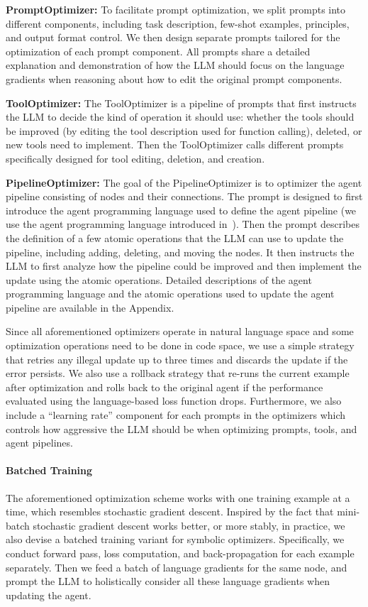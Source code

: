 \documentclass{article}
\begin{document}
\noindent\textbf{PromptOptimizer:} To facilitate prompt optimization, we split prompts into different components, including task description, few-shot examples, principles, and output format control. We then design separate prompts tailored for the optimization of each prompt component. All prompts share a detailed explanation and demonstration of how the LLM should focus on the language gradients when reasoning about how to edit the original prompt components.

\noindent\textbf{ToolOptimizer:} The ToolOptimizer is a pipeline of prompts that first instructs the LLM to decide the kind of operation it should use: whether the tools should be improved (by editing the tool description used for function calling), deleted, or new tools need to implement. Then the ToolOptimizer calls different prompts specifically designed for tool editing, deletion, and creation. 

\noindent\textbf{PipelineOptimizer:}
The goal of the PipelineOptimizer is to optimizer the agent pipeline consisting of nodes and their connections. The prompt is designed to first introduce the agent programming language used to define the agent pipeline (we use the agent programming language introduced in~\citet{zhou2023agents}). Then the prompt describes the definition of a few atomic operations that the LLM can use to update the pipeline, including adding, deleting, and moving the nodes. It then instructs the LLM to first analyze how the pipeline could be improved and then implement the update using the atomic operations. Detailed descriptions of the agent programming language and the atomic operations used to update the agent pipeline are available in the Appendix.

Since all aforementioned optimizers operate in natural language space and some optimization operations need to be done in code space, we use a simple strategy that retries any illegal update up to three times and discards the update if the error persists. We also use a rollback strategy that re-runs the current example after optimization and rolls back to the original agent if the performance evaluated using the language-based loss function drops. Furthermore, we also include a ``learning rate'' component for each prompts in the optimizers which controls how aggressive the LLM should be when optimizing prompts, tools, and agent pipelines.

\paragraph{Batched Training}
The aforementioned optimization scheme works with one training example at a time, which resembles stochastic gradient descent. Inspired by the fact that mini-batch stochastic gradient descent works better, or more stably, in practice, we also devise a batched training variant for symbolic optimizers. Specifically, we conduct forward pass, loss computation, and back-propagation for each example separately. Then we feed a batch of language gradients for the same node, and prompt the LLM to holistically consider all these language gradients when updating the agent.   
\end{document}
